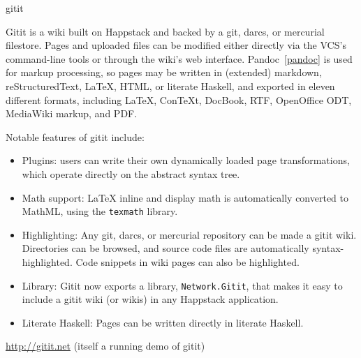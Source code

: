 \begin{hcarentry}[updated]{gitit}
\label{gitit}
\makeheader

Gitit is a wiki built on Happstack and backed by a git, darcs, or mercurial
filestore. Pages and uploaded files can be modified either directly
via the VCS's command-line tools or through the wiki's web interface.
Pandoc~\cref{pandoc} is used for markup processing, so pages may be written in
(extended) markdown, reStructuredText, LaTeX, HTML, or literate Haskell,
and exported in eleven different formats, including LaTeX, ConTeXt,
DocBook, RTF, OpenOffice ODT, MediaWiki markup, and PDF.

Notable features of gitit include:
\begin{itemize}
\item
  Plugins: users can write their own dynamically loaded page transformations,
  which operate directly on the abstract syntax tree.
\item
  Math support:  LaTeX inline and display math is automatically converted
  to MathML, using the \texttt{texmath} library.
\item
  Highlighting:  Any git, darcs, or mercurial repository can be made a gitit wiki.
  Directories can be browsed, and source code files are
  automatically syntax-highlighted.  Code snippets in wiki pages
  can also be highlighted.
\item
  Library: Gitit now exports a library, \texttt{Network.Gitit}, that makes it
  easy to include a gitit wiki (or wikis) in any Happstack application.
\item
  Literate Haskell: Pages can be written directly in literate Haskell.
\end{itemize}

\FurtherReading
\url{http://gitit.net} (itself
a running demo of gitit)
\end{hcarentry}
